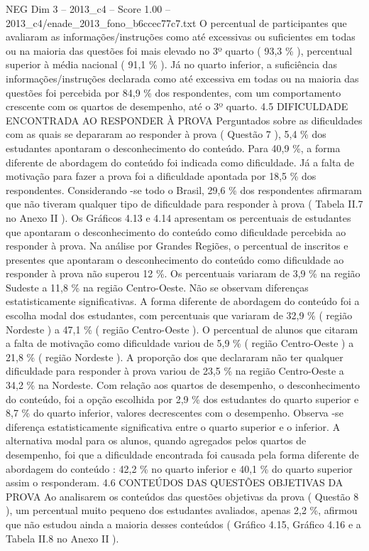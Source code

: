 \begin{textsample}{NEG Dim 3 – 2013\_c4 – Score 1.00 – 2013\_c4/enade\_2013\_fono\_b6ccec77c7.txt}
O percentual de participantes que avaliaram as informações/instruções como até excessivas ou suficientes em todas ou na maioria das questões foi mais elevado no 3º quarto ( 93,3 \% ), percentual superior à média nacional ( 91,1 \% ).
Já no quarto inferior, a suficiência das informações/instruções declarada como até excessiva em todas ou na maioria das questões foi percebida por 84,9 \% dos respondentes, com um comportamento crescente com os quartos de desempenho, até o 3º quarto. 4.5 DIFICULDADE ENCONTRADA AO RESPONDER À PROVA Perguntados sobre as dificuldades com as quais se depararam ao responder à prova ( Questão 7 ), 5,4 \% dos estudantes apontaram o desconhecimento do conteúdo.
Para 40,9 \%, a forma diferente de abordagem do conteúdo foi indicada como dificuldade.
Já a falta de motivação para fazer a prova foi a dificuldade apontada por 18,5 \% dos respondentes.
Considerando -se todo o Brasil, 29,6 \% dos respondentes afirmaram que não tiveram qualquer tipo de dificuldade para responder à prova ( Tabela II.7 no Anexo II ).
Os Gráficos 4.13 e 4.14 apresentam os percentuais de estudantes que apontaram o desconhecimento do conteúdo como dificuldade percebida ao responder à prova.
Na análise por Grandes Regiões, o percentual de inscritos e presentes que apontaram o desconhecimento do conteúdo como dificuldade ao responder à prova não superou 12 \%.
Os percentuais variaram de 3,9 \% na região Sudeste a 11,8 \% na região Centro-Oeste.
Não se observam diferenças estatisticamente significativas.
A forma diferente de abordagem do conteúdo foi a escolha modal dos estudantes, com percentuais que variaram de 32,9 \% ( região Nordeste ) a 47,1 \% ( região Centro-Oeste ).
O percentual de alunos que citaram a falta de motivação como dificuldade variou de 5,9 \% ( região Centro-Oeste ) a 21,8 \% ( região Nordeste ).
A proporção dos que declararam não ter qualquer dificuldade para responder à prova variou de 23,5 \% na região Centro-Oeste a 34,2 \% na Nordeste.
Com relação aos quartos de desempenho, o desconhecimento do conteúdo, foi a opção escolhida por 2,9 \% dos estudantes do quarto superior e 8,7 \% do quarto inferior, valores decrescentes com o desempenho.
Observa -se diferença estatisticamente significativa entre o quarto superior e o inferior.
A alternativa modal para os alunos, quando agregados pelos quartos de desempenho, foi que a dificuldade encontrada foi causada pela forma diferente de abordagem do conteúdo : 42,2 \% no quarto inferior e 40,1 \% do quarto superior assim o responderam. 4.6 CONTEÚDOS DAS QUESTÕES OBJETIVAS DA PROVA Ao analisarem os conteúdos das questões objetivas da prova ( Questão 8 ), um percentual muito pequeno dos estudantes avaliados, apenas 2,2 \%, afirmou que não estudou ainda a maioria desses conteúdos ( Gráfico 4.15, Gráfico 4.16 e a Tabela II.8 no Anexo II ).

\end{textsample}
